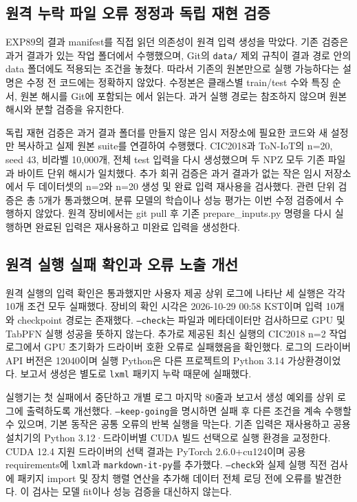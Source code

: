 \subsection{원격 누락 파일 오류 정정과 독립 재현 검증}
EXP89의 결과 manifest를 직접 읽던 의존성이 원격 입력 생성을 막았다.
기존 검증은 과거 결과가 있는 작업 폴더에서 수행했으며, Git의 \texttt{data/} 제외 규칙이 결과 경로 안의 data 폴더에도 적용되는 조건을 놓쳤다.
따라서 기존의 원본만으로 실행 가능하다는 설명은 수정 전 코드에는 정확하지 않았다.
수정본은 클래스별 train/test 수와 특징 순서, 원본 해시를 Git에 포함되는 에서 읽는다.
과거 실행 경로는 참조하지 않으며 원본 해시와 분할 검증을 유지한다.

독립 재현 검증은 과거 결과 폴더를 만들지 않은 임시 저장소에 필요한 코드와 새 설정만 복사하고 실제 원본 suite를 연결하여 수행했다.
CIC2018과 ToN-IoT의 n=20, seed 43, 비라벨 10,000개, 전체 test 입력을 다시 생성했으며 두 NPZ 모두 기존 파일과 바이트 단위 해시가 일치했다.
추가 회귀 검증은 과거 결과가 없는 작은 임시 저장소에서 두 데이터셋의 n=2와 n=20 생성 및 완료 입력 재사용을 검사했다.
관련 단위 검증은 총 5개가 통과했으며, 분류 모델의 학습이나 성능 평가는 이번 수정 검증에서 수행하지 않았다.
원격 장비에서는 git pull 후 기존 prepare\_inputs.py 명령을 다시 실행하면 완료된 입력은 재사용하고 미완료 입력을 생성한다.

\subsection{원격 실행 실패 확인과 오류 노출 개선}
원격 실행의 입력 확인은 통과했지만 사용자 제공 상위 로그에 나타난 세 실행은 각각 10개 조건 모두 실패했다.
장비의 확인 시각은 2026-10-29 00:58 KST이며 입력 10개와 checkpoint 경로는 존재했다.
\texttt{--check}는 파일과 메타데이터만 검사하므로 GPU 및 TabPFN 실행 성공을 뜻하지 않는다.
추가로 제공된 최신 실행의 CIC2018 n=2 작업 로그에서 GPU 초기화가 드라이버 호환 오류로 실패했음을 확인했다.
로그의 드라이버 API 버전은 12040이며 실행 Python은 다른 프로젝트의 Python 3.14 가상환경이었다.
보고서 생성은 별도로 \texttt{lxml} 패키지 누락 때문에 실패했다.

실행기는 첫 실패에서 중단하고 개별 로그 마지막 80줄과 보고서 생성 예외를 상위 로그에 출력하도록 개선했다.
\texttt{--keep-going}을 명시하면 실패 후 다른 조건을 계속 수행할 수 있으며, 기본 동작은 공통 오류의 반복 실행을 막는다.
기존 입력은 재사용하고 공용 설치기의 Python 3.12·드라이버별 CUDA 빌드 선택으로 실행 환경을 교정한다.
CUDA 12.4 지원 드라이버의 선택 결과는 PyTorch 2.6.0+cu124이며 공용 requirements에 \texttt{lxml}과 \texttt{markdown-it-py}를 추가했다.
\texttt{--check}와 실제 실행 직전 검사에 패키지 import 및 장치 행렬 연산을 추가해 데이터 전체 로딩 전에 오류를 발견한다.
이 검사는 모델 fit이나 성능 검증을 대신하지 않는다.

